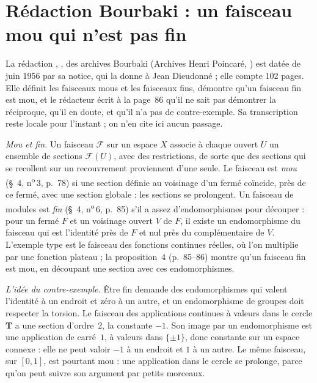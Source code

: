 \section[Rédaction Bourbaki \redac{239} : un faisceau mou qui n'est pas fin]{Rédaction Bourbaki  : un faisceau mou qui n'est pas fin\protect\piste\protect{}}\label{sec:bourbaki-239}

La rédaction , , des archives Bourbaki (Archives Henri Poincaré, ) est datée de juin 1956 par sa notice, qui la donne à Jean Dieudonné ; elle compte 102 pages. Elle définit les faisceaux mous et les faisceaux fins, démontre qu'un faisceau fin est mou, et le rédacteur écrit à la page~86 qu'il ne sait pas démontrer la réciproque, qu'il en doute, et qu'il n'a pas de contre-exemple. Sa transcription reste locale pour l'instant ; on n'en cite ici aucun passage.

\emph{Mou et fin.} Un faisceau $\mathcal F$ sur un espace $X$ associe à chaque ouvert $U$ un ensemble de sections $\mathcal F(U)$, avec des restrictions, de sorte que des sections qui se recollent sur un recouvrement proviennent d'une seule. Le faisceau est \emph{mou} (§~4, n\textsuperscript{o}\,3, p.~78) si une section définie au voisinage d'un fermé coïncide, près de ce fermé, avec une section globale : les sections se prolongent. Un faisceau de modules est \emph{fin} (§~4, n\textsuperscript{o}\,6, p.~85) s'il a assez d'endomorphismes pour découper : pour un fermé $F$ et un voisinage ouvert $V$ de $F$, il existe un endomorphisme du faisceau qui est l'identité près de $F$ et nul près du complémentaire de $V$. L'exemple type est le faisceau des fonctions continues réelles, où l'on multiplie par une fonction plateau ; la proposition~4 (p.~85--86) montre qu'un faisceau fin est mou, en découpant une section avec ces endomorphismes.

\emph{L'idée du contre-exemple.} Être fin demande des endomorphismes qui valent l'identité à un endroit et zéro à un autre, et un endomorphisme de groupes doit respecter la torsion. Le faisceau des applications continues à valeurs dans le cercle $\mathbf T$ a une section d'ordre~2, la constante $-1$. Son image par un endomorphisme est une application de carré~$1$, à valeurs dans $\{\pm 1\}$, donc constante sur un espace connexe : elle ne peut valoir $-1$ à un endroit et $1$ à un autre. Le même faisceau, sur $[0, 1]$, est pourtant mou : une application dans le cercle se prolonge, parce qu'on peut suivre son argument par petits morceaux.

